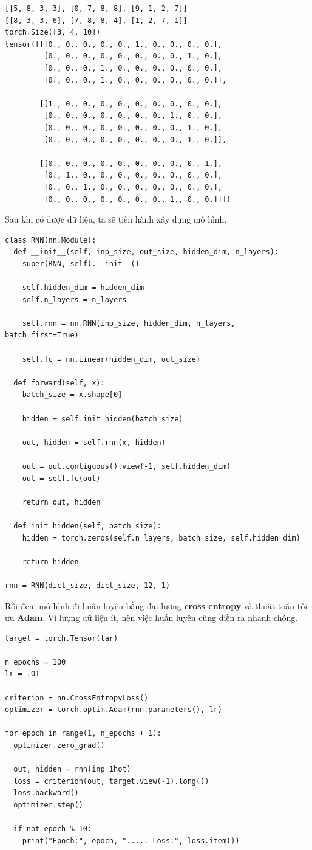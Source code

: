 \documentclass[a4paper]{article}
\begin{document}
\begin{verbatim}
[[5, 8, 3, 3], [0, 7, 8, 8], [9, 1, 2, 7]]
[[8, 3, 3, 6], [7, 8, 8, 4], [1, 2, 7, 1]]
torch.Size([3, 4, 10])
tensor([[[0., 0., 0., 0., 0., 1., 0., 0., 0., 0.],
         [0., 0., 0., 0., 0., 0., 0., 0., 1., 0.],
         [0., 0., 0., 1., 0., 0., 0., 0., 0., 0.],
         [0., 0., 0., 1., 0., 0., 0., 0., 0., 0.]],

        [[1., 0., 0., 0., 0., 0., 0., 0., 0., 0.],
         [0., 0., 0., 0., 0., 0., 0., 1., 0., 0.],
         [0., 0., 0., 0., 0., 0., 0., 0., 1., 0.],
         [0., 0., 0., 0., 0., 0., 0., 0., 1., 0.]],

        [[0., 0., 0., 0., 0., 0., 0., 0., 0., 1.],
         [0., 1., 0., 0., 0., 0., 0., 0., 0., 0.],
         [0., 0., 1., 0., 0., 0., 0., 0., 0., 0.],
         [0., 0., 0., 0., 0., 0., 0., 1., 0., 0.]]])
\end{verbatim}
Sau khi có được dữ liệu, ta sẽ tiến hành xây dựng mô hình.
\begin{lstlisting}
class RNN(nn.Module):
  def __init__(self, inp_size, out_size, hidden_dim, n_layers):
    super(RNN, self).__init__()

    self.hidden_dim = hidden_dim
    self.n_layers = n_layers

    self.rnn = nn.RNN(inp_size, hidden_dim, n_layers, batch_first=True)

    self.fc = nn.Linear(hidden_dim, out_size)

  def forward(self, x):
    batch_size = x.shape[0]

    hidden = self.init_hidden(batch_size)

    out, hidden = self.rnn(x, hidden)

    out = out.contiguous().view(-1, self.hidden_dim)
    out = self.fc(out)

    return out, hidden

  def init_hidden(self, batch_size):
    hidden = torch.zeros(self.n_layers, batch_size, self.hidden_dim)

    return hidden
    
rnn = RNN(dict_size, dict_size, 12, 1)
\end{lstlisting}
Rồi đem mô hình đi huấn luyện bằng đại lương \textbf{cross entropy} và thuật toán tối ưu \textbf{Adam}. Vì lượng dữ liệu ít, nên việc huấn luyện cũng diễn ra nhanh chóng.
\begin{lstlisting}
target = torch.Tensor(tar)

n_epochs = 100
lr = .01

criterion = nn.CrossEntropyLoss()
optimizer = torch.optim.Adam(rnn.parameters(), lr)

for epoch in range(1, n_epochs + 1):
  optimizer.zero_grad()

  out, hidden = rnn(inp_1hot)
  loss = criterion(out, target.view(-1).long())
  loss.backward()
  optimizer.step()

  if not epoch % 10:
    print("Epoch:", epoch, "..... Loss:", loss.item())
\end{lstlisting}
\end{document}
